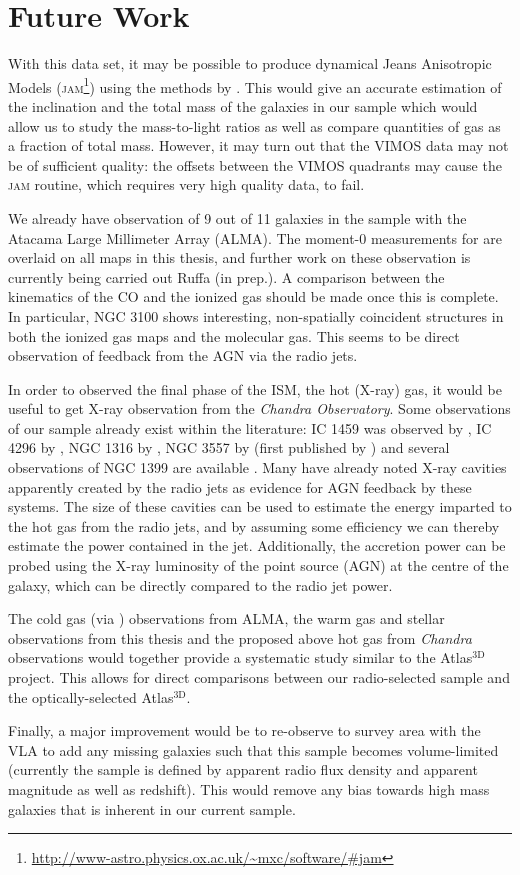 \section{Future Work}
	\label{sec:future}
	With this data set, it may be possible to produce dynamical Jeans Anisotropic Models (\textsc{jam}\footnote{\url{http://www-astro.physics.ox.ac.uk/~mxc/software/\#jam}}) using the methods by \citet{Cappellari2008}. This would give an accurate estimation of the inclination and the total mass of the galaxies in our sample which would allow us to study the mass-to-light ratios as well as compare quantities of gas as a fraction of total mass. However, it may turn out that the VIMOS data may not be of sufficient quality: the offsets between the VIMOS quadrants may cause the \textsc{jam} routine, which requires very high quality data, to fail. 

	We already have observation of 9 out of 11 galaxies in the sample with the Atacama Large Millimeter Array (ALMA). The moment-0 measurements for  are overlaid on all maps in this thesis, and further work on these observation is currently being carried out Ruffa (in prep.). A comparison between the kinematics of the CO and the ionized gas should be made once this is complete. In particular, NGC 3100 shows interesting, non-spatially coincident structures in both the ionized gas maps and the molecular gas. This seems to be direct observation of feedback from the AGN via the radio jets. 

	In order to observed the final phase of the ISM, the hot (X-ray) gas, it would be useful to get X-ray observation from the \textit{Chandra Observatory}. Some observations of our sample already exist within the literature: IC 1459 was observed by \citet{Fabbiano2003}, IC 4296 by \citet{Pellegrini2002}, NGC 1316 by \citet{Lanz2010}, NGC 3557 by \citet{Ponman2001} (first published by \citealt{Balmaverde2005}) and several observations of NGC 1399 are available \citep[e.g.][]{Su2017}. Many have already noted X-ray cavities apparently created by the radio jets as evidence for AGN feedback by these systems. The size of these cavities can be used to estimate the energy imparted to the hot gas from the radio jets, and by assuming some efficiency we can thereby estimate the power contained in the jet. Additionally, the accretion power can be probed using the X-ray luminosity of the point source (AGN) at the centre of the galaxy, which can be directly compared to the radio jet power.

	The cold gas (via ) observations from ALMA, the warm gas and stellar observations from this thesis and the proposed above hot gas from \textit{Chandra} observations would together provide a systematic study similar to the Atlas$^\text{3D}$ project. This allows for direct comparisons between our radio-selected sample and the optically-selected Atlas$^\text{3D}$. 

	Finally, a major improvement would be to re-observe to survey area with the VLA to add any missing galaxies such that this sample becomes volume-limited (currently the sample is defined by apparent radio flux density and apparent magnitude as well as redshift). This would remove any bias towards high mass galaxies that is inherent in our current sample.
